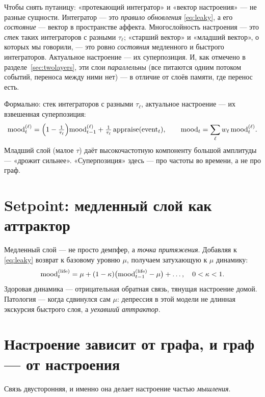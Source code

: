 \begin{intuition}
Чтобы снять путаницу: «протекающий интегратор» и «вектор настроения» — не разные
сущности. Интегратор — это \emph{правило обновления} \eqref{eq:leaky}, а его
\emph{состояние} — вектор в пространстве аффекта. Многослойность настроения — это
\emph{стек} таких интеграторов с разными $\tau_\ell$; «старший вектор» и «младший
вектор», о которых мы говорили, — это ровно \emph{состояния} медленного и быстрого
интеграторов. Актуальное настроение — их суперпозиция. И, как отмечено в
разделе~\ref{sec:twolayers}, эти слои \emph{параллельны} (все питаются одним потоком
событий, переноса между ними нет) — в отличие от слоёв памяти, где перенос есть.
\end{intuition}

Формально: стек интеграторов с разными $\tau_\ell$, актуальное настроение — их
взвешенная суперпозиция:
\begin{equation}
\mathrm{mood}^{(\ell)}_t=\Big(1-\tfrac{1}{\tau_\ell}\Big)\mathrm{mood}^{(\ell)}_{t-1}+\tfrac{1}{\tau_\ell}\,\text{appraise}(\text{event}_t),
\qquad
\mathrm{mood}_t=\sum_\ell w_\ell\,\mathrm{mood}^{(\ell)}_t .
\end{equation}
Младший слой (малое $\tau$) даёт высокочастотную компоненту большой амплитуды —
«дрожит сильнее». «Суперпозиция» здесь — про частоты во времени, а не про граф.

\section{Setpoint: медленный слой как аттрактор}

Медленный слой — не просто демпфер, а \emph{точка притяжения}. Добавляя к
\eqref{eq:leaky} возврат к базовому уровню $\mu$, получаем затухающую к $\mu$
динамику:
\[
\mathrm{mood}^{(\text{life})}_t=\mu+(1-\kappa)\big(\mathrm{mood}^{(\text{life})}_{t-1}-\mu\big)+\ldots,\quad 0<\kappa<1 .
\]
Здоровая динамика — отрицательная обратная связь, тянущая настроение домой. Патология
— когда сдвинулся сам $\mu$: депрессия в этой модели не длинная экскурсия быстрого
слоя, а \emph{уехавший аттрактор}.

\section{Настроение зависит от графа, и граф — от настроения}

Связь двусторонняя, и именно она делает настроение частью \emph{мышления}.


